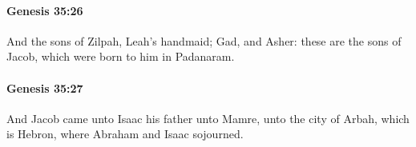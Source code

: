 		\paragraph{Genesis 35:26} %
			\label{GENESIS-35-26}

			And the sons of Zilpah, Leah's handmaid; Gad, and Asher: these are the sons of Jacob, which were born to him in Padanaram.


		\paragraph{Genesis 35:27} %
			\label{GENESIS-35-27}

			And Jacob came unto Isaac his father unto Mamre, unto the city of Arbah, which is Hebron, where Abraham and Isaac sojourned.


